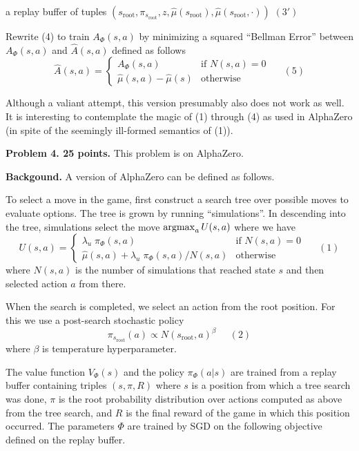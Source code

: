 \documentclass{article}
\begin{document}
\medskip
\centerline{a replay buffer of tuples $(s_{\mathrm{root}},\pi_{s_{\mathrm{root}}},z,\hat{\mu}(s_{\mathrm{root}}),\hat{\mu}(s_{\mathrm{root}},\cdot))$ \hspace{2em}$(3')$}

\medskip
Rewrite (4) to train $A_\Phi(s,a)$ by minimizing a squared ``Bellman Error'' between $A_\Phi(s,a)$ and $\hat{A}(s,a)$ defined as follows
$$\hat{A}(s,a) =  \left\{\begin{array}{ll}A_\Phi(s,a) &\mbox{if $N(s,a) = 0$} \\ \hat{\mu}(s,a) - \hat{\mu}(s) & \mbox{otherwise} \end{array}\right.\;\;\;\;\;(5)$$

\medskip
Although a valiant attempt, this version presumably also does not work as well.
It is interesting to contemplate the magic of (1) through (4) as used in AlphaZero (in spite of the seemingly ill-formed semantics of (1)).

\bigskip
{\bf Problem 4. 25 points.}
This problem is on AlphaZero.

\medskip
{\bf Backgound.}
A version of AlphaZero can be defined as follows.

\medskip
To select a move in the game, first construct a search tree over possible moves to evaluate options.
The tree is grown by running ``simulations''. 
In descending into the tree, simulations select the move $\operatorname*{argmax}_a U(s,a)$ where we have
$$U(s,a) =  \left\{\begin{array}{ll}\lambda_u\; \pi_\Phi(s,a) &\mbox{if $N(s,a) = 0$} \\ \hat{\mu}(s,a) + \lambda_u\; \pi_\Phi(s,a)/N(s,a) & \mbox{otherwise} \end{array}\right.\;\;\;\;\;(1)$$
where $N(s,a)$ is the number of simulations that reached state $s$ and then selected action $a$ from there.

\medskip
When the search is completed, we select an action from the root position.  For this we use a post-search stochastic policy
$$\pi_{s_{\mathrm{root}}}(a) \propto N(s_{\mathrm{root}},a)^\beta\;\;\;\;\;(2)$$
where $\beta$ is temperature hyperparameter.

\medskip
The value function $V_\Phi(s)$ and the policy $\pi_\Phi(a|s)$ are trained from a replay buffer containing triples $(s,\pi,R)$ where $s$ is a position from which a tree search was done,
$\pi$ is the root probability distribution over actions computed as above from the tree search, and $R$ is the final reward of the game in which this position occurred.
The parameters $\Phi$ are trained by SGD on the following objective defined on the replay buffer.
\end{document}
